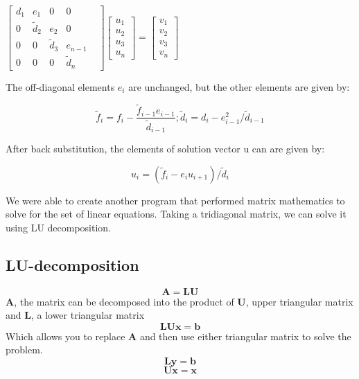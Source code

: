 \documentclass[10pt,showpacs,preprintnumbers,footinbib,amsmath,amssymb,aps,prl,twocolumn,groupedaddress,superscriptaddress,showkeys]{revtex4-1}
\begin{document}
\begin{center}
		$\begin{bmatrix}
			d_{1}& e_{1} & 0 & 0 \\
			0 & \tilde{d}_{2} & e_{2} & 0 & \\
			0 & 0 & \tilde{d}_{3} & e_{n-1}   \\
			0 & 0 & 0 & \tilde{d}_{n} 
	
		\end{bmatrix}
		 \begin{bmatrix}
			u_{1} \\
			u_{2} \\
			u_{3} \\
			u_{n} 
		\end{bmatrix} =
		\begin{bmatrix}
			v_{1} \\
			v_{2} \\
			v_{3} \\
			v_{n}
		\end{bmatrix}$
		\end{center}

The off-diagonal elements $e_{i}$ are unchanged, but the other elements are given by:

	\begin{equation}
	\tilde{f}_{i}=f_{i}-\frac{\tilde{f}_{i-1}e_{i-1}}{\tilde{d}_{i-1}} ; \tilde{d}_{i}=d_{i}-e^{2}_{i-1}/\tilde{d}_{i-1}
	\label{forward}
	\end{equation}
	
After back substitution, the elements of solution vector u can are given by:

	\begin{equation}
	u_{i} = (\tilde{f}_{i}-e_{i}u_{i+1})/\tilde{d}_{i}
	\label{backward}
	\end{equation}

We were able to create another program that performed matrix mathematics to solve for the set of linear equations.  Taking a tridiagonal matrix, we can solve it using LU decomposition.
	
	\subsection{LU-decomposition}
	
	\begin{equation} \mathbf{A=LU} \end{equation}
$\mathbf{A}$, the matrix can be decomposed into the product of  $\mathbf{U}$, upper triangular matrix and $\mathbf{L}$, a lower triangular matrix
	\begin{equation} \mathbf{LUx=b} \end{equation}
	Which allows you to replace $\mathbf{A}$ and then use either triangular matrix to solve the problem.
	\begin{equation} \mathbf{Ly=b} \end{equation}
	\begin{equation} \mathbf{Ux=x} \end{equation}
\end{document}

